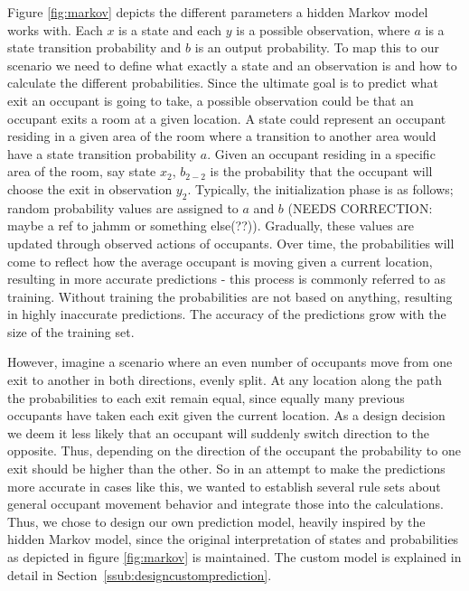 Figure \ref{fig:markov} depicts the different parameters a hidden Markov model works with. Each \(x\) is a state and each \(y\) is a possible observation, where \(a\) is a state transition probability and \(b\) is an output probability. To map this to our scenario we need to define what exactly a state and an observation is and how to calculate the different probabilities. Since the ultimate goal is to predict what exit an occupant is going to take, a possible observation could be that an occupant exits a room at a given location. A state could represent an occupant residing in a given area of the room where a transition to another area would have a state transition probability \(a\). Given an occupant residing in a specific area of the room, say state \(x_2\), \(b_{2-2}\) is the probability that the occupant will choose the exit in observation \(y_2\). Typically, the initialization phase is as follows; random probability values are assigned to \(a\) and \(b\) (NEEDS CORRECTION: maybe a ref to jahmm or something else(??)). Gradually, these values are updated through observed actions of occupants. Over time, the probabilities will come to reflect how the average occupant is moving given a current location, resulting in more accurate predictions - this process is commonly referred to as training. Without training the probabilities are not based on anything, resulting in highly inaccurate predictions. The accuracy of the predictions grow with the size of the training set. 

However, imagine a scenario where an even number of occupants move from one exit to another in both directions, evenly split. At any location along the path the probabilities to each exit remain equal, since equally many previous occupants have taken each exit given the current location. As a design decision we deem it less likely that an occupant will suddenly switch direction to the opposite. Thus, depending on the direction of the occupant the probability to one exit should be higher than the other. So in an attempt to make the predictions more accurate in cases like this, we wanted to establish several rule sets about general occupant movement behavior and integrate those into the calculations. Thus, we chose to design our own prediction model, heavily inspired by the hidden Markov model, since the original interpretation of states and probabilities as depicted in figure \ref{fig:markov} is maintained. The custom model is explained in detail in Section~\ref{ssub:designcustomprediction}. 